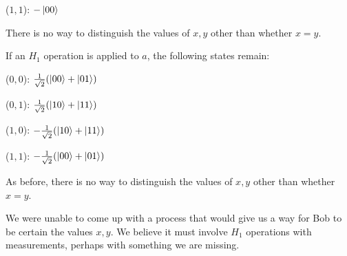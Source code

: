 \documentclass{article}
\begin{document}
\smallskip
($1,1$): $-\ket{00}$

There is no way to distinguish the values of $x,y$ other than whether $x=y$.

\bigskip
\noindent If an $H_1$ operation is applied to $a$, the following states remain:

\smallskip
($0,0$): $\frac1{\sqrt2}(\ket{00} + \ket{01})$

\smallskip
($0,1$): $\frac1{\sqrt2}(\ket{10} + \ket{11})$

\smallskip
($1,0$): $-\frac1{\sqrt2}(\ket{10} + \ket{11})$

\smallskip
($1,1$): $-\frac1{\sqrt2}(\ket{00} + \ket{01})$

As before, there is no way to distinguish the values of $x,y$ other than whether $x=y$.


\bigskip

\bigskip

We were unable to come up with a process that would give us a way for Bob to be certain the values $x,y$.  We believe it must involve $H_1$ operations with measurements, perhaps with something we are missing.
\end{document}
